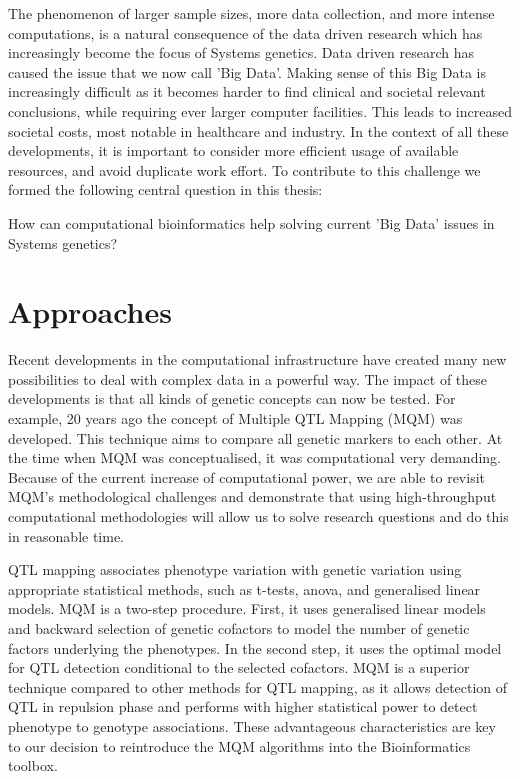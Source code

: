 The phenomenon of larger sample sizes, more data collection, and more intense computations, is a natural 
consequence of the data driven research which has increasingly become the focus of Systems genetics. Data 
driven research has caused the issue that we now call 'Big Data'. Making sense of this Big Data is increasingly 
difficult as it becomes harder to find clinical and societal relevant conclusions, while requiring ever 
larger computer facilities. This leads to increased societal costs, most notable in healthcare and industry. 
In the context of all these developments, it is important to consider more efficient usage of available 
resources, and avoid duplicate work effort. To contribute to this challenge we formed the following central 
question in this thesis:

How can computational bioinformatics help solving current 'Big Data' issues in Systems genetics?

\section{Approaches}

Recent developments in the computational infrastructure have created many new possibilities to deal with 
complex data in a powerful way. The impact of these developments is that all kinds of genetic concepts can 
now be tested. For example, 20 years ago the concept of Multiple QTL Mapping (MQM) was developed. This technique 
aims to compare all genetic markers to each other. At the time when MQM was conceptualised, it was computational 
very demanding. Because of the current increase of computational power, we are able to revisit MQM's methodological 
challenges and demonstrate that using high-throughput computational methodologies will allow us to solve research questions and 
do this in reasonable time. 

QTL mapping associates phenotype variation with genetic variation using appropriate statistical methods, such as 
t-tests, anova, and generalised linear models. MQM is a two-step procedure. First, it uses generalised linear models 
and backward selection of genetic cofactors to model the number of genetic factors underlying the phenotypes. In 
the second step, it uses the optimal model for QTL detection conditional to the selected cofactors. MQM is a superior 
technique compared to other methods for QTL mapping, as it allows detection of QTL in repulsion phase and performs 
with higher statistical power to detect phenotype to genotype associations. These advantageous characteristics 
are key to our decision to reintroduce the MQM algorithms into the Bioinformatics toolbox.

